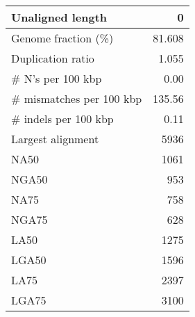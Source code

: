 \documentclass[12pt,a4paper]{article}
\begin{document}
\begin{table}[ht]
\begin{center}
\begin{tabular}{|l*{1}{|r}|}
Unaligned length & 0 \\ \hline
Genome fraction (\%) & 81.608 \\ \hline
Duplication ratio & 1.055 \\ \hline
\# N's per 100 kbp & 0.00 \\ \hline
\# mismatches per 100 kbp & 135.56 \\ \hline
\# indels per 100 kbp & 0.11 \\ \hline
Largest alignment & 5936 \\ \hline
NA50 & 1061 \\ \hline
NGA50 & 953 \\ \hline
NA75 & 758 \\ \hline
NGA75 & 628 \\ \hline
LA50 & 1275 \\ \hline
LGA50 & 1596 \\ \hline
LA75 & 2397 \\ \hline
LGA75 & 3100 \\ \hline
\end{tabular}
\end{center}
\end{table}
\end{document}

